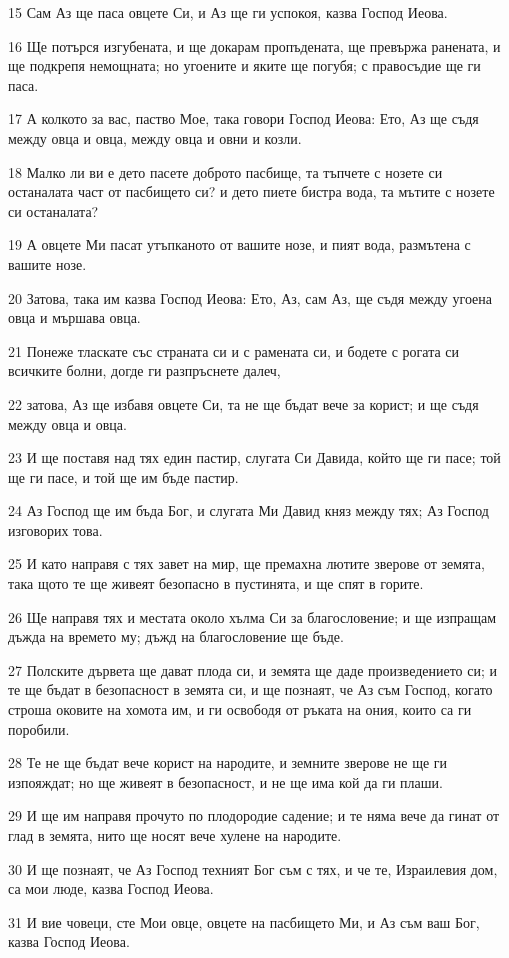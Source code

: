 \par 15 Сам Аз ще паса овцете Си, и Аз ще ги успокоя, казва Господ Иеова.
\par 16 Ще потърся изгубената, и ще докарам пропъдената, ще превържа ранената, и ще подкрепя немощната; но угоените и яките ще погубя; с правосъдие ще ги паса.
\par 17 А колкото за вас, паство Мое, така говори Господ Иеова: Ето, Аз ще съдя между овца и овца, между овца и овни и козли.
\par 18 Малко ли ви е дето пасете доброто пасбище, та тъпчете с нозете си останалата част от пасбището си? и дето пиете бистра вода, та мътите с нозете си останалата?
\par 19 А овцете Ми пасат утъпканото от вашите нозе, и пият вода, размътена с вашите нозе.
\par 20 Затова, така им казва Господ Иеова: Ето, Аз, сам Аз, ще съдя между угоена овца и мършава овца.
\par 21 Понеже тласкате със страната си и с рамената си, и бодете с рогата си всичките болни, догде ги разпръснете далеч,
\par 22 затова, Аз ще избавя овцете Си, та не ще бъдат вече за корист; и ще съдя между овца и овца.
\par 23 И ще поставя над тях един пастир, слугата Си Давида, който ще ги пасе; той ще ги пасе, и той ще им бъде пастир.
\par 24 Аз Господ ще им бъда Бог, и слугата Ми Давид княз между тях; Аз Господ изговорих това.
\par 25 И като направя с тях завет на мир, ще премахна лютите зверове от земята, така щото те ще живеят безопасно в пустинята, и ще спят в горите.
\par 26 Ще направя тях и местата около хълма Си за благословение; и ще изпращам дъжда на времето му; дъжд на благословение ще бъде.
\par 27 Полските дървета ще дават плода си, и земята ще даде произведението си; и те ще бъдат в безопасност в земята си, и ще познаят, че Аз съм Господ, когато строша оковите на хомота им, и ги освободя от ръката на ония, които са ги поробили.
\par 28 Те не ще бъдат вече корист на народите, и земните зверове не ще ги изпояждат; но ще живеят в безопасност, и не ще има кой да ги плаши.
\par 29 И ще им направя прочуто по плодородие садение; и те няма вече да гинат от глад в земята, нито ще носят вече хулене на народите.
\par 30 И ще познаят, че Аз Господ техният Бог съм с тях, и че те, Израилевия дом, са мои люде, казва Господ Иеова.
\par 31 И вие човеци, сте Мои овце, овцете на пасбището Ми, и Аз съм ваш Бог, казва Господ Иеова.

